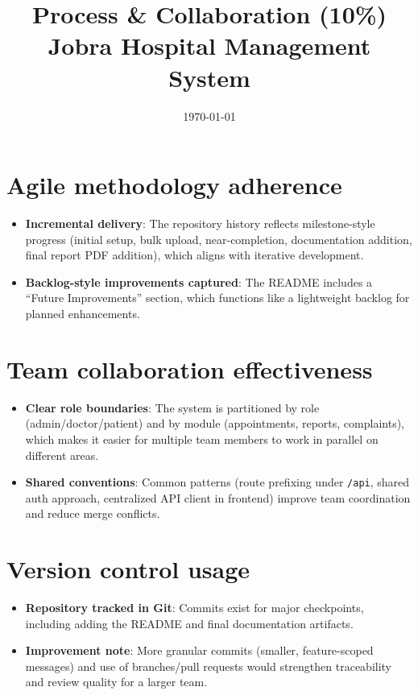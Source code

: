 \documentclass[12pt,a4paper]{article}
\title{Process \& Collaboration (10\%)\\Jobra Hospital Management System}
\author{}
\date{\today}
\begin{document}
\maketitle

\section{Agile methodology adherence}
\begin{itemize}[leftmargin=*, itemsep=0.4em]
  \item \textbf{Incremental delivery}: The repository history reflects milestone-style progress (initial setup, bulk upload, near-completion, documentation addition, final report PDF addition), which aligns with iterative development.
  \item \textbf{Backlog-style improvements captured}: The README includes a ``Future Improvements'' section, which functions like a lightweight backlog for planned enhancements.
\end{itemize}

\section{Team collaboration effectiveness}
\begin{itemize}[leftmargin=*, itemsep=0.4em]
  \item \textbf{Clear role boundaries}: The system is partitioned by role (admin/doctor/patient) and by module (appointments, reports, complaints), which makes it easier for multiple team members to work in parallel on different areas.
  \item \textbf{Shared conventions}: Common patterns (route prefixing under \texttt{/api}, shared auth approach, centralized API client in frontend) improve team coordination and reduce merge conflicts.
\end{itemize}

\section{Version control usage}
\begin{itemize}[leftmargin=*, itemsep=0.4em]
  \item \textbf{Repository tracked in Git}: Commits exist for major checkpoints, including adding the README and final documentation artifacts.
  \item \textbf{Improvement note}: More granular commits (smaller, feature-scoped messages) and use of branches/pull requests would strengthen traceability and review quality for a larger team.
\end{itemize}
\end{document}
